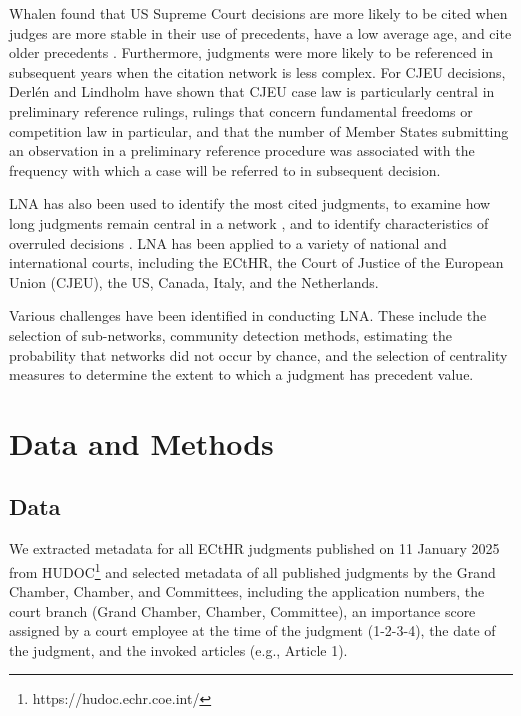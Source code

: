 \documentclass[sigconf,authordraft]{acmart}
\begin{document}
Whalen found that US Supreme Court decisions are more likely to be cited when judges are more stable in their use of precedents, have a low average age, and cite older precedents \cite{Whalen2013}. Furthermore, judgments were more likely to be referenced in subsequent years when the citation network is less complex.
For CJEU decisions, Derlén and Lindholm have shown that CJEU case law is particularly central in preliminary reference rulings, rulings that concern fundamental freedoms or competition law in particular, and that the number of Member States submitting an observation in a preliminary reference procedure was associated with the frequency with which a case will be referred to in subsequent decision\cite{Derlén_Lindholm_2015}.

LNA has also been used to identify the most cited judgments, to examine how long judgments remain central in a network \cite{neale2013}, and to identify characteristics of overruled decisions \cite{whalen2014}. LNA has been applied to a variety of national and international courts, including the ECtHR, the Court of Justice of the European Union (CJEU)\cite{Derlen_etal_2014}, the US\cite{whalen2014}, Canada\cite{neale2013}, Italy\cite{agnoloni2015}, and the Netherlands\cite{vankuppevelt2017}.

Various challenges have been identified in conducting LNA. These include the selection of sub-networks, community detection methods, estimating the probability that networks did not occur by chance, and the selection of centrality measures to determine the extent
to which a judgment has precedent value\cite{vankuppevelt2020}.


\section{Data and Methods}

\subsection{Data}

We extracted metadata for all ECtHR judgments published on 11 January 2025 from HUDOC\footnote{https://hudoc.echr.coe.int/} and selected metadata of all published judgments by the Grand Chamber, Chamber, and Committees, including the application numbers, the court branch (Grand Chamber, Chamber, Committee), an importance score assigned by a court employee at the time of the judgment (1-2-3-4), the date of the judgment, and the invoked articles (e.g., Article 1).
\end{document}
